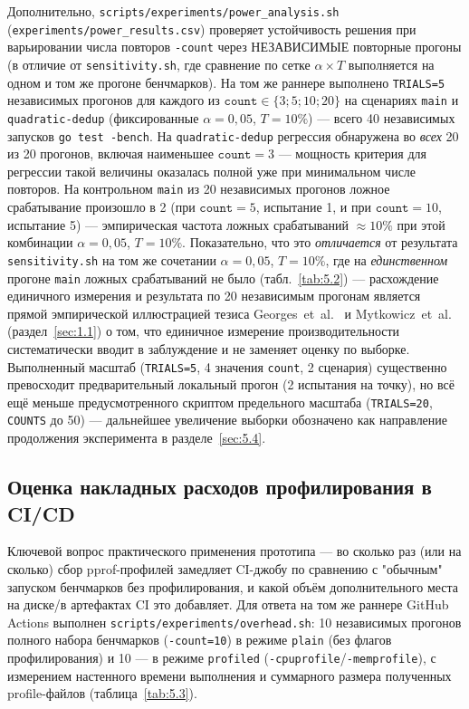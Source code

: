 \documentclass[12pt,a4paper]{article}
\numberwithin{equation}{section}
\begin{document}
Дополнительно, \texttt{scripts/\allowbreak experiments/\allowbreak power\_analysis.sh}
(\texttt{experiments/\allowbreak power\_results.csv}) проверяет устойчивость решения
при варьировании числа повторов \texttt{-count} через НЕЗАВИСИМЫЕ повторные
прогоны (в отличие от \texttt{sensitivity.sh}, где сравнение по сетке
$\alpha \times T$ выполняется на одном и том же прогоне бенчмарков). На том же
раннере выполнено \texttt{TRIALS=5} независимых прогонов для каждого из
$\texttt{count} \in \{3;5;10;20\}$ на сценариях \texttt{main} и
\texttt{quadratic-dedup} (фиксированные $\alpha=0{,}05$, $T=10\%$) — всего 40
независимых запусков \texttt{go test -bench}. На \texttt{quadratic-dedup}
регрессия обнаружена во \emph{всех} 20 из 20 прогонов, включая наименьшее
$\texttt{count}=3$ — мощность критерия для регрессии такой величины
оказалась полной уже при минимальном числе повторов. На контрольном
\texttt{main} из 20 независимых прогонов ложное срабатывание произошло в 2
(при $\texttt{count}=5$, испытание 1, и при $\texttt{count}=10$, испытание
5) — эмпирическая частота ложных срабатываний $\approx 10\%$ при этой
комбинации $\alpha=0{,}05$, $T=10\%$. Показательно, что это \emph{отличается}
от результата \texttt{sensitivity.sh} на том же сочетании $\alpha=0{,}05$,
$T=10\%$, где на \emph{единственном} прогоне \texttt{main} ложных
срабатываний не было (табл.~\ref{tab:5.2}) — расхождение единичного
измерения и результата по 20 независимым прогонам является прямой
эмпирической иллюстрацией тезиса Georges~et~al.~\cite{georges2007} и
Mytkowicz~et~al.~\cite{mytkowicz2009} (раздел~\ref{sec:1.1}) о том, что
единичное измерение производительности систематически вводит в
заблуждение и не заменяет оценку по выборке. Выполненный масштаб
(\texttt{TRIALS=5}, 4 значения \texttt{count}, 2 сценария) существенно
превосходит предварительный локальный прогон (2 испытания на точку), но
всё ещё меньше предусмотренного скриптом предельного масштаба
(\texttt{TRIALS=20}, \texttt{COUNTS} до 50) — дальнейшее увеличение
выборки обозначено как направление продолжения эксперимента в
разделе~\ref{sec:5.4}.

\subsection{Оценка накладных расходов профилирования в CI/CD}
\label{sec:5.3}

Ключевой вопрос практического применения прототипа — во сколько раз (или
на сколько) сбор pprof-профилей замедляет CI-джобу по сравнению с
"обычным" запуском бенчмарков без профилирования, и какой объём
дополнительного места на диске/в артефактах CI это добавляет. Для ответа
на том же раннере GitHub Actions выполнен
\texttt{scripts/\allowbreak experiments/\allowbreak overhead.sh}: 10 независимых прогонов
полного набора бенчмарков (\texttt{-count=10}) в режиме \texttt{plain} (без
флагов профилирования) и 10 — в режиме \texttt{profiled}
(\texttt{-cpuprofile}/\texttt{-memprofile}), с измерением настенного
времени выполнения и суммарного размера полученных profile-файлов
(таблица~\ref{tab:5.3}).
\end{document}
